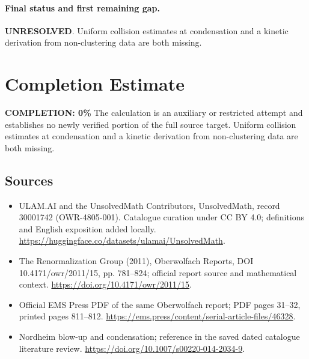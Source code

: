 \documentclass[11pt]{article}
\begin{document}
\paragraph{Final status and first remaining gap.}
\textbf{UNRESOLVED}. Uniform collision estimates at condensation and a kinetic derivation from non-clustering data are both missing.

\section{Completion Estimate}
\noindent\textbf{COMPLETION: 0\%}
The calculation is an auxiliary or restricted attempt and establishes no newly verified portion of the full source target. Uniform collision estimates at condensation and a kinetic derivation from non-clustering data are both missing.

\subsection{Sources}
\begin{itemize}
\item[\hypertarget{source:30001742:1}{S1}] ULAM.AI and the UnsolvedMath Contributors, UnsolvedMath, record 30001742 (OWR-4805-001). Catalogue curation under CC BY 4.0; definitions and English exposition added locally.
\url{https://huggingface.co/datasets/ulamai/UnsolvedMath}.
\item[\hypertarget{source:30001742:2}{S2}] The Renormalization Group (2011), Oberwolfach Reports, DOI 10.4171/owr/2011/15, pp. 781--824; official report source and mathematical context.
\url{https://doi.org/10.4171/owr/2011/15}.
\item[\hypertarget{source:30001742:3}{S3}] Official EMS Press PDF of the same Oberwolfach report; PDF pages 31--32, printed pages 811--812.
\url{https://ems.press/content/serial-article-files/46328}.
\item[\hypertarget{source:30001742:4}{S4}] Nordheim blow-up and condensation; reference in the saved dated catalogue literature review.
\url{https://doi.org/10.1007/s00220-014-2034-9}.
\end{itemize}
\label{end:30001742}
\end{document}
